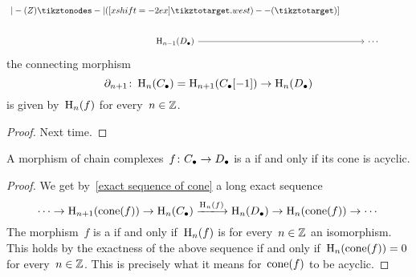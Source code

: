 \begin{proposition}
\begin{enumerate}
\[\begin{tikzcd}
{                              |- (Z) \tikztonodes
                              -| ([xshift=-2ex]\tikztotarget.west)
                              -- (\tikztotarget)}
                  ]
          \\
            \Hl_{n-1}(\Dcc)
            \arrow{r}
          & \dotsb
          & {}
        \end{tikzcd}
      \]
      the connecting morphism
      \[
        \partial_{n+1}
        \colon
        \operatorname{H}_n(C_\bullet)
        =
        \operatorname{H}_{n+1}(C_\bullet[-1])
        \to
        \operatorname{H}_n(D_\bullet)
      \]
      is given by~$\operatorname{H}_n(f)$ for every~$n \in \mathbb{Z}$.
  \end{enumerate}
\end{proposition}


\begin{proof}
  Next time.
\end{proof}


\begin{corollary}
  A morphism of chain complexes~$f \colon C_\bullet \to D_\bullet$ is a {\qim} if and only if its cone is acyclic.
\end{corollary}


\begin{proof}
  We get by~\cref{exact sequence of cone} a long exact sequence
  \[
    \dotsb
    \to
    \Hl_{n+1}(\cone(f))
    \to
    \Hl_n(\Ccc)
    \xlongto{\Hl_n(f)}
    \Hl_n(\Dcc)
    \to
    \Hl_n(\cone(f))
    \to
    \dotsb
  \]
  The morphism~$f$ is a {\qim} if and only if~$\operatorname{H}_n(f)$ is for every~$n \in \mathbb{Z}$ an isomorphism.
  This holds by the exactness of the above sequence if and only if~$\operatorname{H}_n(\operatorname{cone}(f)) = 0$ for every~$n \in \mathbb{Z}$.
  This is precisely what it means for~$\operatorname{cone}(f)$ to be acyclic.
\end{proof}









